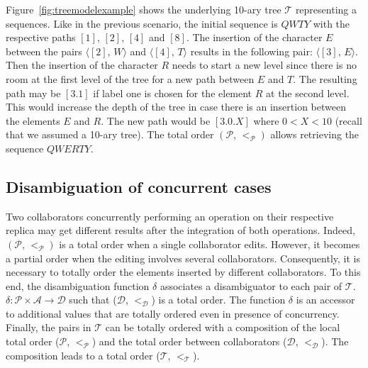 Figure~\ref{fig:treemodelexample} shows the underlying 10-ary tree
$\mathcal{T}$ representing a sequences. Like in the previous scenario, the
initial sequence is $QWTY$ with the respective paths $[1]$, $[2]$, $[4]$ and
$[8]$. The insertion of the character $E$ between the pairs
$\langle [2],\, W\rangle$ and $\langle [4],\, T\rangle$ results in the
following pair: $\langle [3],\, E \rangle$. Then the insertion of the character
$R$ needs to start a new level since there is no room at the first level of the
tree for a new path between $E$ and $T$. The resulting path may be $[3.1]$ if
label one is chosen for the element $R$ at the second level. This would
increase the depth of the tree in case there is an insertion between the
elements $E$ and $R$. The new path would be $[3.0.X]$ where $0<X<10$ (recall
that we assumed a 10-ary tree). The total order $(\mathcal{P},\,<_\mathcal{P})$
allows retrieving the sequence $QWERTY$.

\subsection{Disambiguation of concurrent cases}
\label{subsec:disambiguation}

Two collaborators concurrently performing an operation on their respective
replica may get different results after the integration of both
operations. Indeed, $(\mathcal{P},\,<_\mathcal{P})$ is a total order when a
single collaborator edits. However, it becomes a partial order when the editing
involves several collaborators. Consequently, it is necessary to totally order
the elements inserted by different collaborators. To this end, the
disambiguation function $\delta$ associates a disambiguator to each pair of
$\mathcal{T}$. $\delta: \mathcal{P}\times\mathcal{A} \rightarrow \mathcal{D}$
such that ($\mathcal{D}$, $<_{\mathcal{D}}$) is a total order. The function
$\delta$ is an accessor to additional values that are totally ordered even in
presence of concurrency. Finally, the pairs in $\mathcal{T}$ can be totally
ordered with a composition of the local total order ($\mathcal{P}$,
$<_{\mathcal{P}}$) and the total order between collaborators ($\mathcal{D}$,
$<_{\mathcal{D}}$). The composition leads to a total order ($\mathcal{T}$,
$<_{\mathcal{T}}$).

